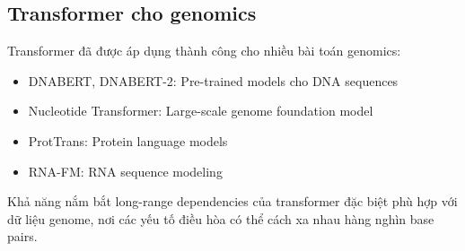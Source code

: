 \subsection{Transformer cho genomics}

Transformer đã được áp dụng thành công cho nhiều bài toán genomics:
\begin{itemize}
    \item DNABERT, DNABERT-2: Pre-trained models cho DNA sequences
    \item Nucleotide Transformer: Large-scale genome foundation model
    \item ProtTrans: Protein language models
    \item RNA-FM: RNA sequence modeling
\end{itemize}

Khả năng nắm bắt long-range dependencies của transformer đặc biệt phù hợp với dữ liệu genome, nơi các yếu tố điều hòa có thể cách xa nhau hàng nghìn base pairs.
